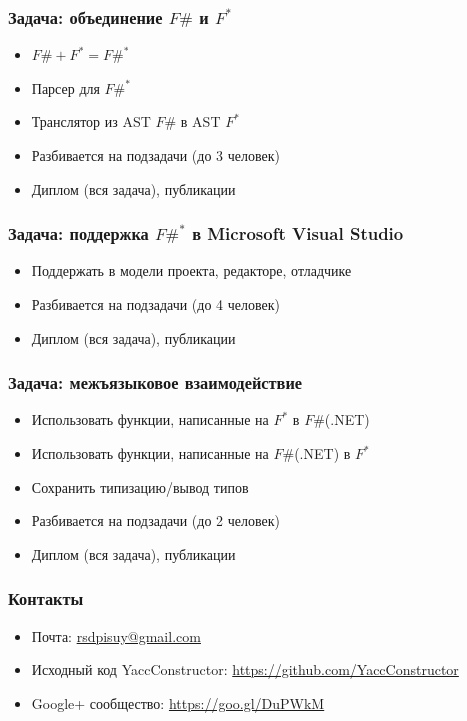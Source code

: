 \documentclass{beamer}
\begin{document}
\begin{frame}
  \transwipe[direction=90]
  \frametitle{Задача: объединение $F\#$ и $F^*$}
  \begin{itemize}
    \item $F\# + F^* = F\#^*$
    \item Парсер для $F\#^*$
    \item Транслятор из AST $F\#$ в AST $F^*$
    \item Разбивается на подзадачи (до 3 человек)
    \item Диплом (вся задача), публикации
  \end{itemize}
\end{frame}

\begin{frame}
  \transwipe[direction=90]
  \frametitle{Задача: поддержка $F\#^*$ в Microsoft Visual Studio}
  \begin{itemize}
    \item Поддержать в модели проекта, редакторе, отладчике
    \item Разбивается на подзадачи (до 4 человек)
    \item Диплом (вся задача), публикации
  \end{itemize}
\end{frame}

\begin{frame}
  \transwipe[direction=90]
  \frametitle{Задача: межъязыковое взаимодействие}
  \begin{itemize}
    \item Использовать функции, написанные на $F^*$ в $F\#$(.NET)
    \item Использовать функции, написанные на $F\#$(.NET) в $F^*$
    \item Сохранить типизацию/вывод типов
    \item Разбивается на подзадачи (до 2 человек)
    \item Диплом (вся задача), публикации
  \end{itemize}
\end{frame}
            
\begin{frame}
\transwipe[direction=90]
\frametitle{Контакты}
\begin{itemize}
  \item Почта: \url{rsdpisuy@gmail.com}
  \item Исходный код YaccConstructor: \url{https://github.com/YaccConstructor}
  \item Google+ сообщество: \url{https://goo.gl/DuPWkM}
\end{itemize}
\end{frame}
\end{document}
